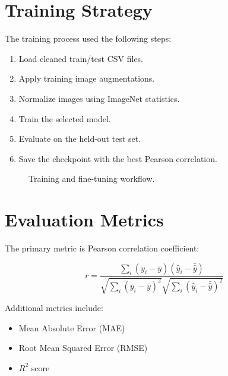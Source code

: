 \documentclass[11pt]{article}
\begin{document}
\section{Training Strategy}

The training process used the following steps:

\begin{enumerate}
    \item Load cleaned train/test CSV files.
    \item Apply training image augmentations.
    \item Normalize images using ImageNet statistics.
    \item Train the selected model.
    \item Evaluate on the held-out test set.
    \item Save the checkpoint with the best Pearson correlation.
\end{enumerate}

\begin{figure}[H]
\centering
{}
\caption{Training and fine-tuning workflow.}
\end{figure}

\section{Evaluation Metrics}

The primary metric is Pearson correlation coefficient:

\[
r = \frac{\sum_i (y_i - \bar{y})(\hat{y}_i - \bar{\hat{y}})}
{\sqrt{\sum_i (y_i - \bar{y})^2}\sqrt{\sum_i(\hat{y}_i - \bar{\hat{y}})^2}}
\]

Additional metrics include:

\begin{itemize}
    \item Mean Absolute Error (MAE)
    \item Root Mean Squared Error (RMSE)
    \item \(R^2\) score
\end{itemize}
\end{document}
